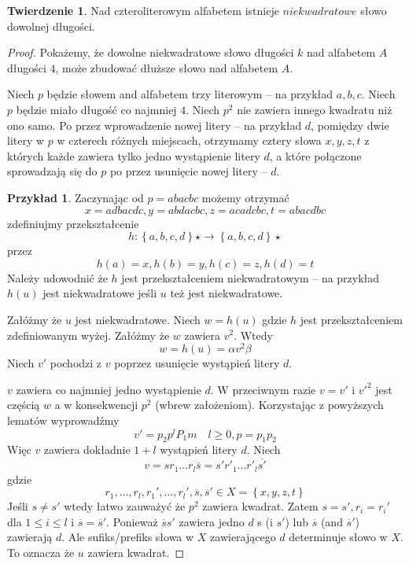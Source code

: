 \documentclass[11pt,a4paper]{article}
\theoremstyle{definition}
\newtheorem{theorem}{Twierdzenie}[section]
\newtheorem{example}{Przykład}[section]
\begin{document}
\begin{theorem}
Nad czteroliterowym alfabetem istnieje $niekwadratowe$
słowo dowolnej długości.
\begin{proof}
Pokażemy, że dowolne niekwadratowe słowo długości $k$ nad alfabetem $A$
długości $4$, może zbudować dłuższe słowo nad alfabetem $A$.

Niech $p$ będzie słowem and alfabetem trzy literowym -- na przykład $a,b,c$.
Niech $p$ będzie miało długość co najmniej $4$.
Niech $p^2$ nie zawiera innego kwadratu niż ono samo.
Po przez wprowadzenie nowej litery -- na przykład $d$, pomiędzy
dwie litery w $p$ w czterech różnych miejscach, otrzymamy cztery
słowa $x,y,z,t$ z których każde zawiera tylko jedno wystąpienie litery $d$,
a które połączone sprowadzają się do $p$ po przez usunięcie nowej litery -- $d$.

\begin{example}
Zaczynając od $p = abacbc$ możemy otrzymać
$$
x = adbacdc, y = abdacbc, z = acadcbc, t = abacdbc
$$
zdefiniujmy przekształcenie
$$
h: \left\lbrace a,b,c,d\right\rbrace\star \rightarrow \left\lbrace a,b,c,d\right\rbrace\star
$$
przez
$$
h(a) = x, h(b) = y, h(c) = z, h(d) = t
$$
Należy udowodnić że $h$ jest przekształceniem niekwadratowym -- na przykład
$h(u)$ jest niekwadratowe jeśli $u$ też jest niekwadratowe.
\end{example}
Załóżmy że $u$ jest niekwadratowe. Niech $w=h(u)$ gdzie $h$ jest przekształceniem
zdefiniowanym wyżej. Załóżmy że $w$ zawiera $v^2$. Wtedy
$$
w = h(u) = \alpha v^2\beta
$$
Niech $v'$ pochodzi z $v$ poprzez usunięcie wystąpień litery $d$.

$v$ zawiera co najmniej jedno wystąpienie $d$. W przeciwnym razie $v = v'$ i
$v'^2$ jest częścią $w$ a w konsekwencji $p^2$ (wbrew założeniom). Korzystając z
powyższych lematów wyprowadźmy
$$
v' = p_2 p^l P_1 m \quad l \geqslant 0, p = p_1 p_2
$$
Więc $v$ zawiera dokładnie $1+l$ wystąpień litery $d$. Niech
$$
v = sr_1\dots r_l\overline{s} = s'r'_1\dots r'_l\overline{s'}
$$
gdzie
$$
r_1,\ldots,r_l,r_1',\ldots,r_l',\overline{s},\overline{s}'
\in X = \left\lbrace x,y,z,t \right\rbrace
$$
Jeśli $s \neq s'$ wtedy łatwo zauważyć że $p^2$ zawiera kwadrat.
Zatem $s=s', r_i=r_i'$ dla
$1 \leqslant i \leqslant l$
i
$\overline{s} = \overline{s}'$. Ponieważ $\overline{s}s'$ zawiera
jedno $d$ s (i $s'$) lub $\overline{s}$ (and $\overline{s}'$)
zawierają $d$. Ale sufiks/prefiks słowa w $X$ zawierającego $d$
determinuje słowo w $X$. To oznacza że $u$ zawiera kwadrat.
\end{proof}
\end{theorem}
\end{document}
